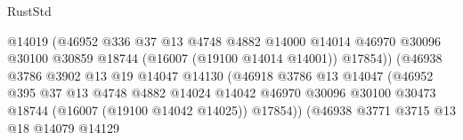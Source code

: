 \begin{lexlean}{RustStd}
\begin{coremodule}
                                            @14019
                                            (@46952
                                              @336
                                              @37
                                              @13
                                              @4748
                                              @4882
                                              @14000
                                              @14014
                                              @46970
                                              @30096
                                              @30100
                                              @30859
                                              @18744
                                              (@16007 (@19100 @14014 @14001))
                                              @17854))
                                          (@46938
                                            @3786
                                            @3902
                                            @13
                                            @19
                                            @14047
                                            @14130
                                            (@46918
                                              @3786
                                              @13
                                              @14047
                                              (@46952
                                                @395
                                                @37
                                                @13
                                                @4748
                                                @4882
                                                @14024
                                                @14042
                                                @46970
                                                @30096
                                                @30100
                                                @30473
                                                @18744
                                                (@16007 (@19100 @14042 @14025))
                                                @17854))
                                            (@46938
                                              @3771
                                              @3715
                                              @13
                                              @18
                                              @14079
                                              @14129

\end{coremodule}
\end{lexlean}
